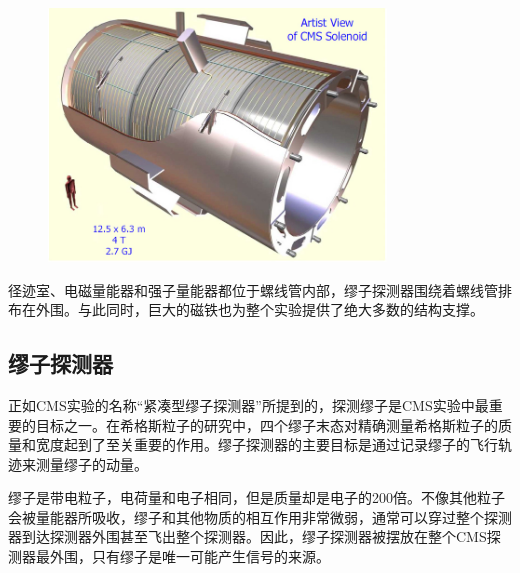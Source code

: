 \begin{figure}[!htbp]
    \centering
    \includegraphics[width=0.8\textwidth]{figures/chapter02/CMS-solenoid-magnet.jpeg}
    \label{fig:c02f07}
\end{figure}

径迹室、电磁量能器和强子量能器都位于螺线管内部，缪子探测器围绕着螺线管排布在外围。与此同时，巨大的磁铁也为整个实验提供了绝大多数的结构支撑。

\subsection{缪子探测器}\label{sec:MuonDetector}

正如CMS实验的名称“紧凑型缪子探测器”所提到的，探测缪子是CMS实验中最重要的目标之一。在希格斯粒子的研究中，四个缪子末态对精确测量希格斯粒子的质量和宽度起到了至关重要的作用。缪子探测器的主要目标是通过记录缪子的飞行轨迹来测量缪子的动量。

缪子是带电粒子，电荷量和电子相同，但是质量却是电子的200倍。不像其他粒子会被量能器所吸收，缪子和其他物质的相互作用非常微弱，通常可以穿过整个探测器到达探测器外围甚至飞出整个探测器。因此，缪子探测器被摆放在整个CMS探测器最外围，只有缪子是唯一可能产生信号的来源。

